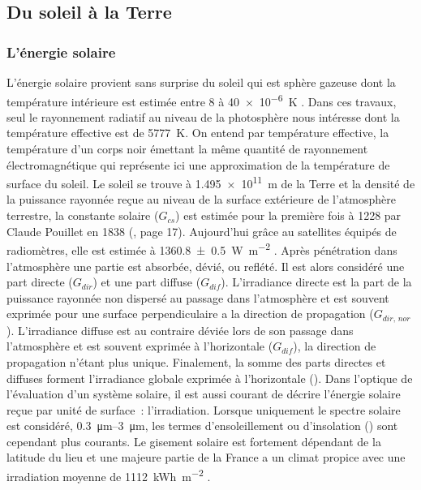 \subsection{Du soleil à la Terre} %
\label{sub:du_soleil_a_la_terre}
\subsubsection{L’énergie solaire} %
\label{ssub:l_energie_solaire}
L’énergie solaire provient sans surprise du soleil qui est sphère gazeuse dont la
température intérieure est estimée entre \num{8} à \SI{40e-6}{\kelvin}
\parencite{Duffie1980}. Dans ces travaux, seul le rayonnement radiatif au niveau de la
photosphère nous intéresse dont la température effective est de \SI{5777}{\kelvin}. On
entend par température effective, la température d’un corps noir émettant la même quantité
de rayonnement électromagnétique qui représente ici une approximation de la température de
surface du soleil. Le soleil se trouve à \SI{1.495e11}{\metre} de la Terre et la densité
de la puissance rayonnée reçue au niveau de la surface extérieure de l’atmosphère
terrestre, la constante solaire ($G_{cs}$) est estimée pour la première fois à \num{1228}
par Claude Pouillet en 1838 (\cite{Coulson2012}, page 17). Aujourd’hui grâce au satellites équipés de radiomètres,
elle est estimée à \SI{1360.8 +- 0.5}{\watt\per\metre\squared} \parencite{Kopp2011}. Après
pénétration dans l’atmosphère une partie est absorbée, dévié, ou reflété. Il est alors
considéré une part directe ($G_{dir}$) et une part diffuse ($G_{dif}$). L’irradiance
directe est la part de la puissance rayonnée non dispersé au passage dans l’atmosphère et
est souvent exprimée pour une surface perpendiculaire a la direction de propagation
($G_{dir,\,nor}$). L’irradiance diffuse est au contraire déviée lors de son passage dans
l’atmosphère et est souvent exprimée à l’horizontale ($G_{dif}$), la direction de
propagation n’étant plus unique. Finalement, la somme des parts directes et diffuses
forment l’irradiance globale exprimée à l’horizontale (). Dans l’optique de
l’évaluation d’un système solaire, il est aussi courant de décrire l’énergie solaire reçue
par unité de surface~: l’irradiation. Lorsque uniquement le spectre solaire est considéré,
\SIrange{0.3}{3}{\micro\metre}, les termes d’ensoleillement ou d’insolation () sont
cependant plus courants.
Le gisement solaire est fortement dépendant de la latitude du lieu et une majeure partie
de la France a un climat propice avec une irradiation moyenne de \SI{1112}{kWh\per\metre\squared}
.


